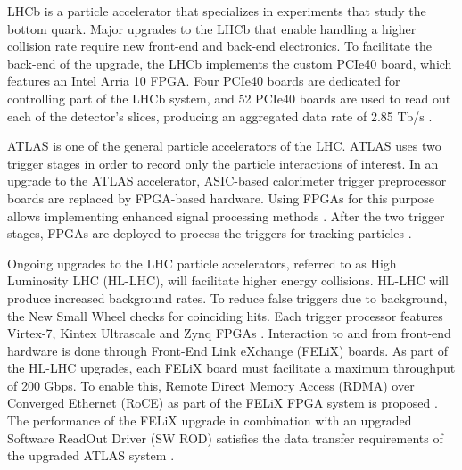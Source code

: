 LHCb is a particle accelerator that specializes in experiments that study the bottom quark. Major upgrades to the LHCb that enable handling a higher collision rate require new front-end and back-end electronics. To facilitate the back-end of the upgrade, the LHCb implements the custom PCIe40 board, which features an Intel Arria 10 FPGA. Four PCIe40 boards are dedicated for controlling part of the LHCb system, and 52 PCIe40 boards are used to read out each of the detector’s slices, producing an aggregated data rate of 2.85 Tb/s \cite{FernandezPrieto2020PhaseExperiment}.

ATLAS is one of the general particle accelerators of the LHC. ATLAS uses two trigger stages in order to record only the particle interactions of interest. In an upgrade to the ATLAS accelerator, ASIC-based calorimeter trigger preprocessor boards are replaced by FPGA-based hardware. Using FPGAs for this purpose allows implementing enhanced signal processing methods \cite{Aad2020PerformanceTrigger}. After the two trigger stages, FPGAs are deployed to process the triggers for tracking particles \cite{Aad2021TheSystem}.

Ongoing upgrades to the LHC particle accelerators, referred to as High Luminosity LHC (HL-LHC), will facilitate higher energy collisions. HL-LHC will produce increased background rates. To reduce false triggers due to background, the New Small Wheel checks for coinciding hits. Each trigger processor features Virtex-7, Kintex Ultrascale and Zynq FPGAs \cite{Iakovidis2023TheElectronics}. Interaction to and from front-end hardware is done through Front-End Link eXchange (FELiX) boards. As part of the HL-LHC upgrades, each FELiX board must facilitate a maximum throughput of 200 Gbps. To enable this, Remote Direct Memory Access (RDMA) over Converged Ethernet (RoCE) as part of the FELiX FPGA system is proposed \cite{Vasile2022FPGALHC, Vasile2023IntegrationLHC}. The performance of the FELiX upgrade in combination with an upgraded Software ReadOut Driver (SW ROD) satisfies the data transfer requirements of the upgraded ATLAS system \cite{Gottardo2020FEliXSystem}.




